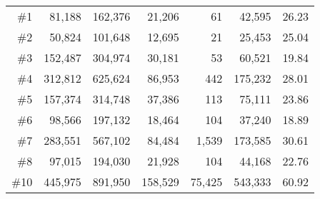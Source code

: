 \begin{table}[]
{\begin{tabular}{rrrrrrr}
\midrule
\#1                  & 81,188                                             & 162,376                                          & 21,206                & 61                    & 42,595                & 26.23                                           \\
\#2                  & 50,824                                             & 101,648                                          & 12,695                & 21                    & 25,453                & 25.04                                           \\
\#3                  & 152,487                                            & 304,974                                          & 30,181                & 53                    & 60,521                & 19.84                                           \\
\#4                  & 312,812                                            & 625,624                                          & 86,953                & 442                   & 175,232               & 28.01                                           \\
\#5                  & 157,374                                            & 314,748                                          & 37,386                & 113                   & 75,111                & 23.86                                           \\
\#6                  & 98,566                                             & 197,132                                          & 18,464                & 104                   & 37,240                & 18.89                                           \\
\#7                  & 283,551                                            & 567,102                                          & 84,484                & 1,539                 & 173,585               & 30.61                                           \\
\#8                  & 97,015                                             & 194,030                                          & 21,928                & 104                   & 44,168                & 22.76                                           \\
\#10                 & 445,975                                            & 891,950                                          & 158,529               & 75,425                & 543,333               & 60.92                                          \\
\bottomrule
\end{tabular}
}
\end{table}